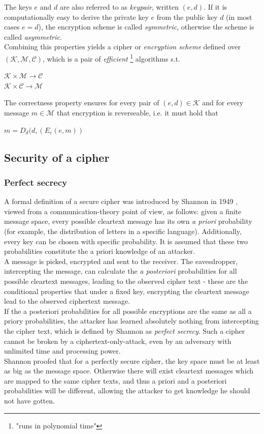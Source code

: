 The keys $e$ and $d$ are also referred to as \textit{keypair}, written $(e,d)$. 
If it is computationally easy to derive the private key $e$ from the public key $d$ (in most cases $e = d$), the encryption scheme
is called \textit{symmetric}, otherwise the scheme is called \textit{asymmetric}.
\\
Combining this properties yields a cipher or \textit{encryption scheme} defined over $\mathcal{(K,M,C)}$, which is a pair of \textit{efficient}
 \footnote{"runs in polynomial time"} algorithms s.t.
 \begin{center}
   $\mathcal{K} \times \mathcal{M} \rightarrow \mathcal{C}$
   \\
   $\mathcal{K} \times \mathcal{C} \rightarrow \mathcal{M}$
 \end{center}
 The correctness property ensures for every pair of $(e,d) \in \mathcal{K}$ and for every message $m \in \mathcal{M}$ that encryption is reverseable, i.e. 
 it must hold that 
 \begin{center}  
 $ m = D_d(d, (E_e(e, m))$
  \end{center}

\subsection{Security of a cipher}

\subsubsection{Perfect secrecy}

A formal definition of a secure cipher was introduced by Shannon in 1949 \cite{6769090}, viewed from a communication-theory point of view, as follows:
given a finite message space, every possible cleartext message has its own \textit{a priori} probability (for example, the distribution of letters in a 
specific language). Additionally, every key can be chosen with specific probability. It is assumed that these
two probabilities constitute the a priori knowledge of an attacker.
\\
A message is picked, encrypted
and sent to the receiver. The eavesdropper, intercepting the message, can calculate the \textit{a posteriori} probabilities for all possible cleartext messages, 
leading to the observed cipher text - these are the conditional properties that under a fixed key, encrypting the cleartext message lead to the
observed ciphertext message.
\\
If the a posteriori probabilities for all possible encryptions are the same as all a priory probabilities, the attacker has learned absolutely
nothing from intercepting the cipher text, which is defined by Shannon as \textit{perfect secrecy}. Such a cipher cannot be broken by a ciphertext-only-attack,
even by an adversary with unlimited time and processing power.
\\
Shannon proofed that for a perfectly secure cipher, the key space must be at least as big as the message space.
Otherwise there will exist cleartext messages which are mapped to the same cipher texts, and thus a priori and a posteriori probabilities will be different,
allowing the attacker to get knowledge he should not have gotten. 

